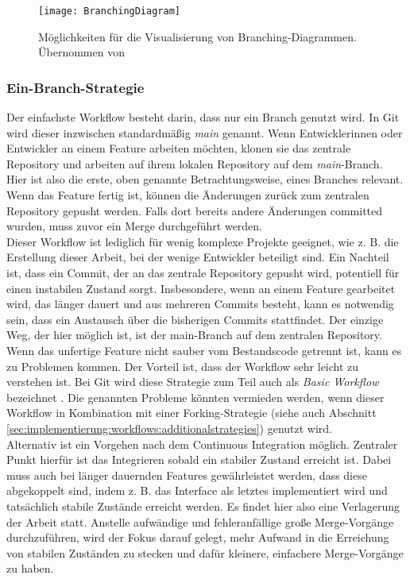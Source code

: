\begin{figure}
\centering
    \texttt{[image: BranchingDiagram]} 
    \caption{Möglichkeiten für die Visualisierung von Branching-Diagrammen. Übernommen von \cite{LeRoy:2017:Twitter:38}}
    \label{fig:branchDiagram}
\end{figure}


\subsubsection{Ein-Branch-Strategie}
\label{sec:implementierung:workflows:basic}

Der einfachste Workflow besteht darin, dass nur ein Branch genutzt wird. In Git wird dieser inzwischen standardmäßig \emph{main} genannt. Wenn Entwicklerinnen oder Entwickler an einem Feature arbeiten möchten, klonen sie das zentrale Repository und arbeiten auf ihrem lokalen Repository auf dem \emph{main}-Branch. Hier ist also die erste, oben genannte Betrachtungsweise, eines Branches relevant. Wenn das Feature fertig ist, können die Änderungen zurück zum zentralen Repository gepusht werden. Falls dort bereits andere Änderungen committed wurden, muss zuvor ein Merge durchgeführt werden.
\\
Dieser Workflow ist lediglich für wenig komplexe Projekte geeignet, wie z. B. die Erstellung dieser Arbeit, bei der wenige Entwickler beteiligt sind. Ein Nachteil ist, dass ein Commit, der an das zentrale Repository gepusht wird, potentiell für einen instabilen Zustand sorgt. Insbesondere, wenn an einem Feature gearbeitet wird, das länger dauert und aus mehreren Commits besteht, kann es notwendig sein, dass ein Austausch über die bisherigen Commits stattfindet. Der einzige Weg, der hier möglich ist, ist der main-Branch auf dem zentralen Repository. Wenn das unfertige Feature nicht sauber vom Bestandscode getrennt ist, kann es zu Problemen kommen. Der Vorteil ist, dass der Workflow sehr leicht zu verstehen ist. Bei Git wird diese Strategie zum Teil auch als \emph{Basic Workflow} bezeichnet \cite{Antony:2021:5-Different:04}. Die genannten Probleme könnten vermieden werden, wenn dieser Workflow in Kombination mit einer Forking-Strategie (siehe auch Abschnitt \ref{sec:implementierung:workflows:additionalstrategies}) genutzt wird.
\\
Alternativ ist ein Vorgehen nach dem Continuous Integration möglich. Zentraler Punkt hierfür ist das Integrieren sobald ein stabiler Zustand erreicht ist. Dabei muss auch bei länger dauernden Features gewährleistet werden, dass diese abgekoppelt sind, indem z. B. das Interface als letztes implementiert wird \cite{Fowler:2020:Patterns:07} und tatsächlich stabile Zustände erreicht werden. Es findet hier also eine Verlagerung der Arbeit statt. Anstelle aufwändige und fehleranfällige große Merge-Vorgänge durchzuführen, wird der Fokus darauf gelegt, mehr Aufwand in die Erreichung von stabilen Zuständen zu stecken und dafür kleinere, einfachere Merge-Vorgänge zu haben.

